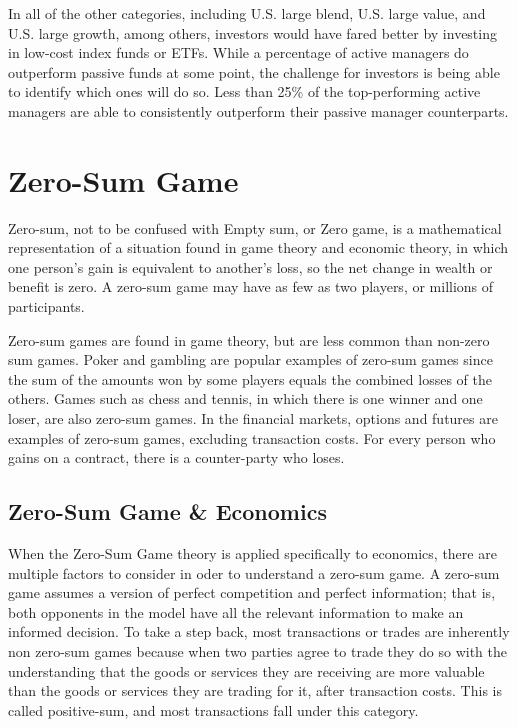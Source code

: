 In all of the other categories, including U.S. large blend, U.S. large value, and U.S. large growth, among others, investors would have fared better by investing in low-cost index funds or ETFs. While a percentage of active managers do outperform passive funds at some point, the challenge for investors is being able to identify which ones will do so. Less than 25\% of the top-performing active managers are able to consistently outperform their passive manager counterparts.

\section{Zero-Sum Game}

Zero-sum, not to be confused with Empty sum, or Zero game, is a mathematical representation of a situation found in game theory and economic theory, in which one person’s gain is equivalent to another’s loss, so the net change in wealth or benefit is zero. A zero-sum game may have as few as two players, or millions of participants.

Zero-sum games are found in game theory, but are less common than non-zero sum games. Poker and gambling are popular examples of zero-sum games since the sum of the amounts won by some players equals the combined losses of the others. Games such as chess and tennis, in which there is one winner and one loser, are also zero-sum games. In the financial markets, options and futures are examples of zero-sum games, excluding transaction costs. For every person who gains on a contract, there is a counter-party who loses.

\subsection{Zero-Sum Game \& Economics}

When the Zero-Sum Game theory is applied specifically to economics, there are multiple factors to consider in oder to understand a zero-sum game. A zero-sum game assumes a version of perfect competition and perfect information; that is, both opponents in the model have all the relevant information to make an informed decision. To take a step back, most transactions or trades are inherently non zero-sum games because when two parties agree to trade they do so with the understanding that the goods or services they are receiving are more valuable than the goods or services they are trading for it, after transaction costs. This is called positive-sum, and most transactions fall under this category.

